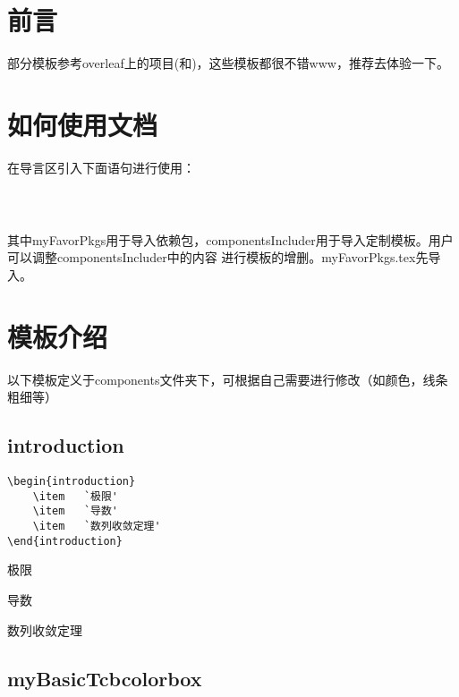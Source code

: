 \documentclass{ctexart}
\begin{document}
    \tableofcontents
    \newpage

    \section{前言}
    部分模板参考overleaf上的项目(和)，这些模板都很不错www，推荐去体验一下。

    \section{如何使用文档}
    在导言区引入下面语句进行使用：
    \begin{lstlisting}
        
        
    \end{lstlisting}

    其中myFavorPkgs用于导入依赖包，componentsIncluder用于导入定制模板。用户可以调整componentsIncluder中的内容
    进行模板的增删。myFavorPkgs.tex先导入。
    \newpage
    \section{模板介绍}
    以下模板定义于components文件夹下，可根据自己需要进行修改（如颜色，线条粗细等）
    \subsection{introduction}

    \begin{lstlisting}
\begin{introduction}
    \item   `极限'
    \item   `导数'
    \item   `数列收敛定理'
\end{introduction}
    \end{lstlisting}
    
    \begin{introduction}
        \item   极限
        \item   导数
        \item   数列收敛定理
    \end{introduction}
    
    \subsection{myBasicTcbcolorbox}
    
\end{document}
